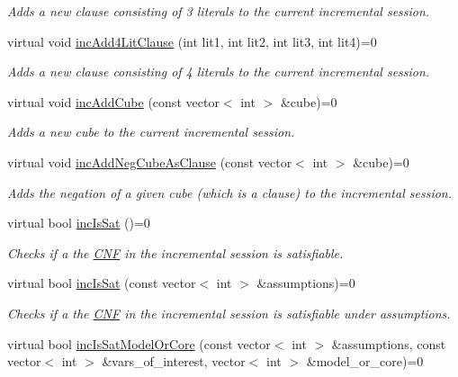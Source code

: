 \begin{DoxyCompactItemize}
\begin{DoxyCompactList}\small\item\em Adds a new clause consisting of 3 literals to the current incremental session. \end{DoxyCompactList}\item 
virtual void \hyperlink{classSatSolver_af01bfc3b8fa15e7b69136b1808c59023}{inc\-Add4\-Lit\-Clause} (int lit1, int lit2, int lit3, int lit4)=0
\begin{DoxyCompactList}\small\item\em Adds a new clause consisting of 4 literals to the current incremental session. \end{DoxyCompactList}\item 
virtual void \hyperlink{classSatSolver_a1f04f34bb04174489ed18d0b62241004}{inc\-Add\-Cube} (const vector$<$ int $>$ \&cube)=0
\begin{DoxyCompactList}\small\item\em Adds a new cube to the current incremental session. \end{DoxyCompactList}\item 
virtual void \hyperlink{classSatSolver_a6be2c564289a59057c4c6728a3aa9c2b}{inc\-Add\-Neg\-Cube\-As\-Clause} (const vector$<$ int $>$ \&cube)=0
\begin{DoxyCompactList}\small\item\em Adds the negation of a given cube (which is a clause) to the incremental session. \end{DoxyCompactList}\item 
virtual bool \hyperlink{classSatSolver_ab1aab4b96a36b2003450067a3799ae23}{inc\-Is\-Sat} ()=0
\begin{DoxyCompactList}\small\item\em Checks if a the \hyperlink{classCNF}{C\-N\-F} in the incremental session is satisfiable. \end{DoxyCompactList}\item 
virtual bool \hyperlink{classSatSolver_a1864787a33621efac7fc75fb6b25f080}{inc\-Is\-Sat} (const vector$<$ int $>$ \&assumptions)=0
\begin{DoxyCompactList}\small\item\em Checks if a the \hyperlink{classCNF}{C\-N\-F} in the incremental session is satisfiable under assumptions. \end{DoxyCompactList}\item 
virtual bool \hyperlink{classSatSolver_ad387fc06bacf2d48847f779c9db8461a}{inc\-Is\-Sat\-Model\-Or\-Core} (const vector$<$ int $>$ \&assumptions, const vector$<$ int $>$ \&vars\-\_\-of\-\_\-interest, vector$<$ int $>$ \&model\-\_\-or\-\_\-core)=0

\end{DoxyCompactItemize}
